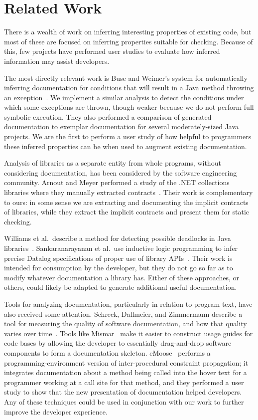 \section{Related Work}
There is a wealth of work on inferring interesting properties of existing code,
but most of these are focused on inferring properties suitable for checking.
Because of this, few projects have performed user studies to evaluate how
inferred information may assist developers.

The most directly relevant work is Buse and Weimer's system for automatically
inferring documentation for conditions that will result in a Java method
throwing an exception~\cite{autodoc}.  We implement a similar analysis
to detect the conditions under which some exceptions are thrown, though weaker
because we do not perform full symbolic execution.  They also performed a
comparison of generated documentation to exemplar documentation for several
moderately-sized Java projects.  We are the first to perform a user study of how
helpful to programmers these inferred properties can be when used to augment existing
documentation.

Analysis of libraries as a separate entity from whole programs, without
considering documentation, has been considered by the software
engineering community.  Arnout and Meyer performed a study of the .NET
collections libraries where they manually extracted
contracts~\cite{findingcontracts}.  Their work is complementary to ours: in some
sense we are extracting and documenting the implicit contracts of libraries,
while they extract the implicit contracts and present them for static checking.

Williams et al.~describe a method for detecting possible deadlocks in Java
libraries~\cite{deadlocklibs}.  Sankaranarayanan et al.~use inductive logic
programming to infer precise Datalog specifications of proper use of library
APIs~\cite{mininglibspecs}.  Their work is intended for consumption by the
developer, but they do not go so far as to modify whatever documentation a
library has.  Either of these approaches, or others, could likely be adapted to
generate additional useful documentation.

Tools for analyzing documentation, particularly in relation to program text,
have also received some attention.  Schreck, Dallmeier, and Zimmermann describe
a tool for measuring the quality of software documentation, and how that
quality varies over time~\cite{evolvedoc}. Tools like Mismar~\cite{mismar} make
it easier to construct usage guides for code bases by allowing the developer to
essentially drag-and-drop software components to form a documentation skeleton.
eMoose~\cite{emoose} performs a programming-environment version of
inter-procedural constraint propagation; it integrates
documentation about a method being called into the hover text for a programmer
working at a call site for that method, and they performed a user study to show
that the new presentation of documentation helped developers.  Any of these techniques could be used
in conjunction with our work to further improve the developer experience.

